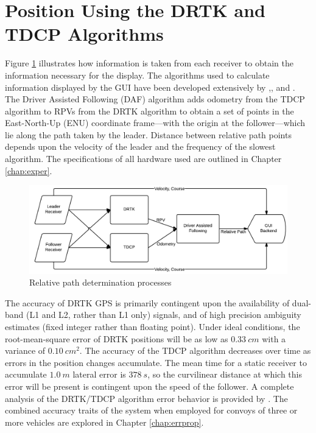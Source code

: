 \documentclass[12pt]{report}
\begin{document}
\section{Position Using the DRTK and TDCP Algorithms}
Figure \ref{fig:drtktdcp} illustrates how information is taken from each receiver to obtain the information necessary for the display. The algorithms used to calculate information displayed by the GUI have been developed extensively by \cite{scottthesis},\cite{travisshort}, \cite{travisconvoy} and \cite{travisdiss}. The Driver Assisted Following (DAF) algorithm adds odometry from the TDCP algorithm to RPVs from the DRTK algorithm to obtain a set of points in the East-North-Up (ENU) coordinate frame---with the origin at the follower---which lie along the path taken by the leader. Distance between relative path points depends upon the velocity of the leader and the frequency of the slowest algorithm. The specifications of all hardware used are outlined in Chapter \ref{chap:exper}.

\begin{figure}[ht]
    \centering
    \includegraphics[width=6.5in]{./figs/data_algo.png}
    \caption{Relative path determination processes}
    \label{fig:drtktdcp}
\end{figure}

The accuracy of DRTK GPS is primarily contingent upon the availability of dual-band (L1 and L2, rather than L1 only) signals, and of high precision ambiguity estimates (fixed integer rather than floating point). Under ideal conditions, the root-mean-square error of DRTK positions will be as low as $0.33~cm$ with a variance of $0.10~cm^2$. 
The accuracy of the TDCP algorithm decreases over time as errors in the position changes accumulate. The mean time for a static receiver to accumulate $1.0~m$ lateral error is $378~s$, so the curvilinear distance at which this error will be present is contingent upon the speed of the follower. A complete analysis of the DRTK/TDCP algorithm error behavior is provided by \cite{scottthesis}. The combined accuracy traits of the system when employed for convoys of three or more vehicles are explored in Chapter \ref{chap:errprop}.
\end{document}
